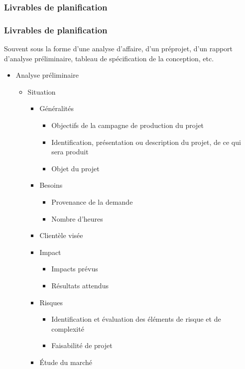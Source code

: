 						\subsubsection{Livrables de planification} 
							\begin{frame}[allowframebreaks]
							\frametitle{Livrables de planification}
                        		Souvent sous la forme d'une analyse d’affaire, d'un préprojet, d'un rapport d’analyse préliminaire, tableau de spécification de la conception, etc.
	
							\begin{itemize}
							\item Analyse préliminaire
								\begin{itemize}
								\item Situation
									\begin{itemize}
									\item Généralités
										\begin{itemize}
										\item Objectifs de la campagne de production du projet
										\item Identification, présentation ou description du projet, de ce qui sera produit
										\item Objet du projet
										\end{itemize}
									\item Besoins
										\begin{itemize}
										\item Provenance de la demande
										\item Nombre d’heures
										\end{itemize}
									\item Clientèle visée
									\item Impact
										\begin{itemize}
										\item Impacts prévus
										\item Résultats attendus
										\end{itemize}
									\item Risques
										\begin{itemize}
										\item Identification et évaluation des éléments de risque et de complexité
										\item Faisabilité de projet
										\end{itemize}
									\item Étude du marché

\end{itemize}
\end{itemize}
\end{itemize}
\end{frame}
